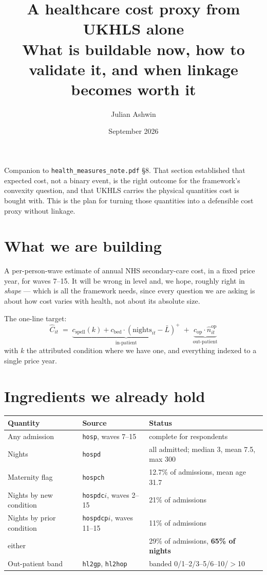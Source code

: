 \documentclass[11pt]{article}
\title{A healthcare cost proxy from UKHLS alone\\[2pt]
\large What is buildable now, how to validate it, and when linkage becomes worth it}
\author{Julian Ashwin}
\date{September 2026}
\newcommand{\code}[1]{\texttt{\small #1}}
\begin{document}
\maketitle

\noindent Companion to \code{health\_measures\_note.pdf} \S8. That section
established that expected cost, not a binary event, is the right outcome for
the framework's convexity question, and that UKHLS carries the physical
quantities cost is bought with. This is the plan for turning those quantities
into a defensible cost proxy without linkage.

\section{What we are building}

A per-person-wave estimate of annual NHS secondary-care cost, in a fixed
price year, for waves 7--15. It will be wrong in level and, we hope, roughly
right in \emph{shape} --- which is all the framework needs, since every
question we are asking is about how cost varies with health, not about its
absolute size.

The one-line target:
\[
  \widehat{C}_{it} \;=\;
  \underbrace{c_{\text{spell}}(k) + c_{\text{bed}} \cdot (\text{nights}_{it} - \bar{L})^{+}}_{\text{in-patient}}
  \;+\;
  \underbrace{c_{\text{op}} \cdot \widehat{n}^{\text{op}}_{it}}_{\text{out-patient}}
\]
with $k$ the attributed condition where we have one, and everything indexed
to a single price year.

\section{Ingredients we already hold}

\begin{center}\small
\begin{tabular}{llp{6.4cm}}
\toprule
Quantity & Source & Status \\
\midrule
Any admission & \code{hosp}, waves 7--15 & complete for respondents \\
Nights & \code{hospd} & all admitted; median 3, mean 7.5, max 300 \\
Maternity flag & \code{hospch} & 12.7\% of admissions, mean age 31.7 \\
Nights by new condition & \code{hospdc}$i$, waves 2--15 & 21\% of admissions \\
Nights by prior condition & \code{hospdcp}$i$, waves 11--15 & 11\% of admissions \\
\quad either & & 29\% of admissions, \textbf{65\% of nights} \\
Out-patient band & \code{hl2gp}, \code{hl2hop} & banded 0/1--2/3--5/6--10/$>$10 \\
\bottomrule
\end{tabular}
\end{center}
\end{document}

